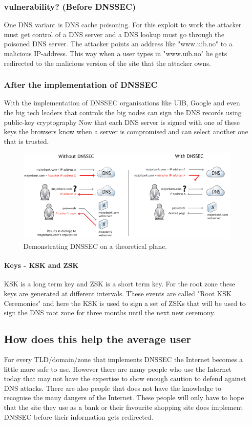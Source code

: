 \documentclass{article}
\begin{document}
	        \subsubsection{vulnerability? (Before DNSSEC)}
	        One DNS variant is DNS cache poisoning. For this exploit to work the attacker must get control of a DNS server and a DNS lookup must go through the poisoned DNS server. The attacker points an address like "www.uib.no" to a malicious IP-address. This way when a user types in "www.uib.no" he gets redirected to the malicious version of the site that the attacker owns.\cite{bellovin}
	        \subsubsection{After the implementation of DNSSEC}
	        With the implementation of DNSSEC organisations like UIB, Google and even the big tech leaders that controls the big nodes can sign the DNS records using public-key cryptography\cite{icann}
	        Now that each DNS server is signed with one of these keys the browsers know when a server is compromised and can select another one that is trusted.\\
	        \begin{figure}[htbp]
	        	\centering
	        	\includegraphics[width=1.0\textwidth]{dnsVsDnssec}
	        	\caption{Demonstrating DNSSEC on a theoretical plane.\cite{icannDnssec}}
	        \end{figure}
				\paragraph{Keys - KSK and ZSK}
				KSK is a long term key and ZSK is a short term key. For the root zone these keys are generated at different intervals. These events are called "Root KSK Ceremonies" and here the KSK is used to sign a set of ZSKs that will be used to sign the DNS root zone for three months until the next new ceremony. \cite{iana}
		\subsection{How does this help the average user}
		For every TLD/domain/zone that implements DNSSEC the Internet becomes a little more safe to use. However there are many people who use the Internet today that may not have the expertise to show enough caution to defend against DNS attacks. There are also people that does not have the knowledge to recognise the many dangers of the Internet. These people will only have to hope that the site they use as a bank or their favourite shopping site does implement DNSSEC before their information gets redirected. 
\end{document}
